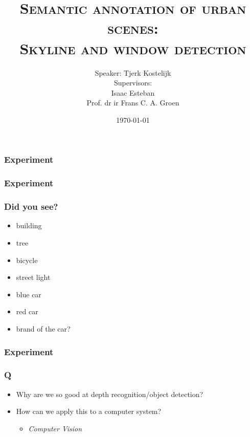 \documentclass{beamer}
\title{\textsc{Semantic annotation of urban scenes:\\Skyline and window detection}}
\subtitle{\vspace{0.5cm}Speaker: Tjerk Kostelijk\\ 
\vspace{1cm}
Supervisors: \\Isaac Esteban\\Prof. dr ir Frans C. A. Groen}
\date{\today}
\begin{document}


\frame{\titlepage}





\frame
{
	\frametitle{Experiment}
}


\frame
{
	\frametitle{Experiment}
}


\frame
{
}



\frame
{
	\frametitle{Did you see?}
	\begin{itemize}
		\item <+-| alert@+> building
		\item <+-| alert@+> tree
		\item <+-| alert@+> bicycle
		\item <+-| alert@+> street light
		\item <+-| alert@+> blue car
		\item <+-| alert@+> red car
		\item <+-| alert@+> brand of the car?
	\end{itemize}
}

\frame
{
	\frametitle{Experiment}
}


\frame
{
	\frametitle{Q}
	\begin{itemize}
	\item <+-| alert@+> Why are we so good at depth recognition/object detection?
	\item <+-| alert@+> How can we apply this to a computer system?
		\begin{itemize}
			\item <+-| alert@+> {\textit{Computer Vision}}
		\end{itemize}
	\end{itemize}
}
\end{document}
